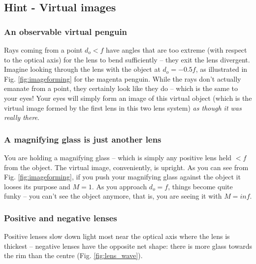 \documentclass[a4paper]{report}
\begin{document}
	\clearpage
	
    \subsection{Hint - Virtual images}
	\hypertarget{hintTo-virtual}{}
	
	\subsubsection{An observable virtual penguin}
	Rays coming from a point $d_o<f$ have angles that are too extreme (with respect to the optical axis) for the lens to bend sufficiently -- they exit the lens divergent. Imagine looking through the lens with the object at $d_o=-0.5f$, as illustrated in Fig. \ref{fig:imageforming} for the magenta penguin. While the rays don't actually emanate from a point, they certainly look like they do -- which is the same to your eyes! Your eyes will simply form an image of this virtual object (which is the virtual image formed by the first lens in this two lens system) \emph{as though it was really there}. 


	
	\subsubsection{A magnifying glass is just another lens}
	You are holding a magnifying glass -- which is simply any positive lens held $<f$ from the object. The virtual image, conveniently, is upright. As you can see from Fig. \ref{fig:imageforming}, if you push your magnifying glass against the object it looses its purpose and $M=1$. As you approach $d_o=f$, things become quite funky -- you can't see the object anymore, that is, you are seeing it with $M=inf$.


	
	\subsubsection{Positive and negative lenses}
	Positive lenses slow down light most near the optical axis where the lens is thickest -- negative lenses have the opposite net shape: there is more glass towards the rim than the centre (Fig. \ref{fig:lens_wave}). 
	
\end{document}

